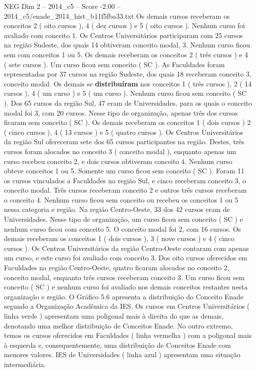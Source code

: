 \begin{textsample}{NEG Dim 2 – 2014\_c5 – Score -2.00 – 2014\_c5/enade\_2014\_hist\_b11f5fba33.txt}
Os demais cursos receberam os conceitos 2 ( oito cursos ), 4 ( dez cursos ) e 5 ( oito cursos ).
Nenhum curso foi avaliado com conceito 1.
Os Centros Universitários participaram com 25 cursos na região Sudeste, dos quais 14 obtiveram conceito modal, 3.
Nenhum curso ficou sem com conceitos 1 ou 5.
Os demais receberam os conceitos 2 ( três cursos ) e 4 ( sete cursos ).
Um curso ficou sem conceito ( SC ).
As Faculdades foram representadas por 37 cursos na região Sudeste, dos quais 18 receberam conceito 3, conceito modal.
Os demais se \textbf{distribuíram} nos conceitos 1 ( três cursos ), 2 ( 14 cursos ), 4 ( um curso ) e 5 ( um curso ).
Nenhum curso ficou sem conceito ( SC ).
Dos 65 cursos da região Sul, 47 eram de Universidades, para os quais o conceito modal foi 3, com 20 cursos.
Nesse tipo de organização, apenas três dos cursos ficaram sem conceito ( SC ).
Os demais receberam os conceitos 1 ( dois cursos ) 2 ( cinco cursos ), 4 ( 13 cursos ) e 5 ( quatro cursos ).
Os Centros Universitários da região Sul ofereceram sete dos 65 cursos participantes na região.
Destes, três cursos foram alocados no conceito 3 ( conceito modal ), enquanto apenas um curso recebeu conceito 2, e dois cursos obtiveram conceito 4.
Nenhum curso obteve conceitos 1 ou 5.
Somente um curso ficou sem conceito ( SC ).
Foram 11 os cursos vinculados a Faculdades na região Sul, e cinco receberam conceito 3, o conceito modal.
Três cursos receberam conceito 2 e outros três cursos receberam o conceito 4.
Nenhum curso ficou sem conceito ou recebeu os conceitos 1 ou 5 nessa categoria e região.
Na região Centro-Oeste, 33 dos 42 cursos eram de Universidades.
Nesse tipo de organização, um curso ficou sem conceito ( SC ) e nenhum curso ficou com conceito 5.
O conceito modal foi 2, com 16 cursos.
Os demais receberam os conceitos 1 ( dois cursos ), 3 ( nove cursos ) e 4 ( cinco cursos ).
Os Centros Universitários da região Centro-Oeste contaram com apenas um curso, e este curso foi avaliado com conceito 3.
Dos oito cursos oferecidos em Faculdades na região Centro-Oeste, quatro ficaram alocados no conceito 2, conceito modal, enquanto três cursos receberam conceito 3.
Um curso ficou sem conceito ( SC ) e nenhum curso foi avaliado nos demais conceitos restantes nesta organização e região.
O Gráfico 5.6 apresenta a distribuição do Conceito Enade segundo a Organização Acadêmica da IES.
Os cursos em Centros Universitários ( linha verde ) apresentam uma poligonal mais à direita do que as demais, denotando uma melhor distribuição de Conceitos Enade.
No outro extremo, temos os cursos oferecidos em Faculdades ( linha vermelha ) com a poligonal mais à esquerda e, consequentemente, uma distribuição de Conceitos Enade com menores valores.
IES de Universidades ( linha azul ) apresentam uma situação intermediária.

\end{textsample}

